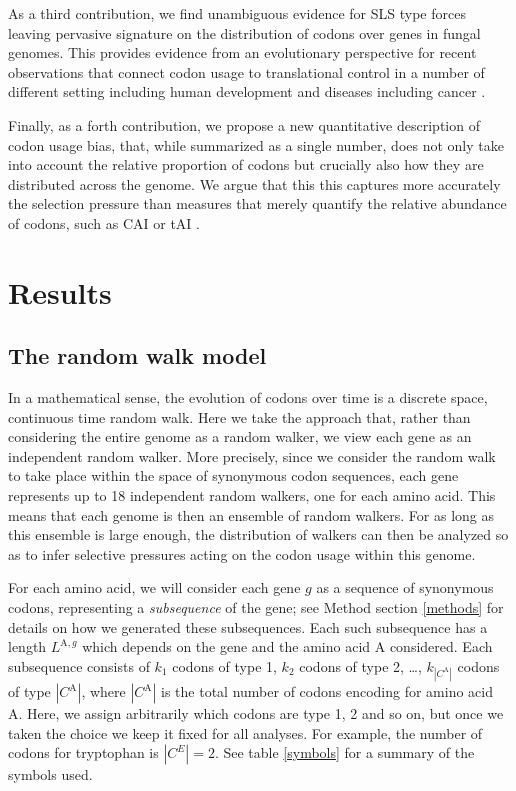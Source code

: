 \documentclass[a4paper,10pt]{paper}%
\begin{document}
\par
As a third contribution,  we find  unambiguous evidence for SLS type  forces leaving pervasive signature on  the distribution of codons over genes in fungal genomes. This provides evidence from an evolutionary perspective for recent observations that connect codon usage to translational control in a number of different setting including human development and diseases including cancer \cite{xxx}.  
\par
Finally, as a forth contribution, we propose a new quantitative description of codon usage bias, that, while summarized as a single number,  does not only take into account the relative proportion of codons but crucially also how they are distributed across the genome. We argue that this this captures more accurately the selection pressure than  measures that merely quantify the relative abundance of codons, such as CAI \cite{cai} or tAI \cite{tai}. 





\section{Results}




\subsection{The random walk model}


In a mathematical sense, the evolution of codons over time is a discrete space, continuous time random walk. Here we take the approach that, rather than considering the entire genome as a random walker, we view each gene as an independent random walker. More precisely, since we consider the random walk to take place within the space of synonymous codon sequences, each gene represents up to 18 independent random walkers, one for each amino acid. This means that each genome is then an ensemble of random walkers. For as long as this ensemble is large enough, the distribution of walkers can then be analyzed so as to infer selective pressures acting on the codon usage within this genome.
\par
For each amino acid, we will consider each gene $g$ as a sequence of synonymous codons, representing a {\em subsequence} of the gene; see Method section \ref{methods} for details on how we generated these subsequences. Each such subsequence has a length $L^{\textrm{A},g}$ which depends on the gene and the amino acid A considered. Each subsequence consists of $k_1$ codons of type 1, $k_2$ codons of type 2, \ldots, $k_{|C^\textrm{A}|}$ codons of type $|C^\textrm{A}|$, where $|C^\textrm{A}|$ is the total number of codons encoding for amino acid A. Here, we assign arbitrarily which codons are type 1, 2 and so on, but once we taken the choice we keep it fixed for all analyses. For example, the number of codons for tryptophan is  $|C^E|=2$. See table \ref{symbols} for a summary of the symbols used.  
\end{document}
